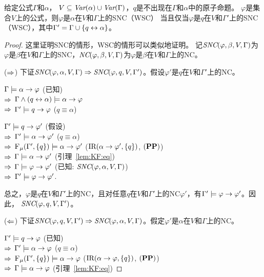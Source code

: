 \begin{proposition}\label{formulaNS_to_p}
	给定公式$\Gamma$和$\alpha$， $V \subseteq \textit{Var}(\alpha) \cup \textit{Var}(\Gamma)$，$q$是不出现在$\Gamma$和$\alpha$中的原子命题。
	$\varphi$是集合$V$上的公式，则$\varphi$是$\alpha$在$V$和$\Gamma$上的SNC（WSC） 当且仅当$\varphi$是$q$在$V$和$\Gamma'$上的SNC（WSC），其中$\Gamma' = \Gamma \cup \{q \leftrightarrow \alpha\}$。
\end{proposition}
\begin{proof}
	这里证明SNC的情形，WSC的情形可以类似地证明。
	记$\emph{SNC}(\varphi,\beta,V,\Gamma)$为$\varphi$是$\beta$在$V$和$\Gamma$上的SNC，$\emph{NC}(\varphi,\beta,V,\Gamma)$为$\varphi$是$\beta$在$V$和$\Gamma$上的NC。
	
	($\Rightarrow$) 下证$\emph{SNC}(\varphi,\alpha,V,\Gamma)\Rightarrow \emph{SNC}(\varphi,q,V,\Gamma')$。假设$\varphi'$是$q$在$V$和$\Gamma'$上的NC。
	
	$\Gamma \models \alpha \rightarrow \varphi$ \hfill  (已知)\\
	$\Rightarrow$ $\Gamma \wedge (q \leftrightarrow \alpha) \models \alpha \rightarrow \varphi$\\
	$\Rightarrow$ $\Gamma' \models q \rightarrow \varphi$  \hfill ($q \equiv \alpha$)
	
	$\Gamma' \models q \rightarrow \varphi'$ \hfill (假设) \\
	$\Rightarrow$ $\Gamma' \models \alpha \rightarrow \varphi'$ \hfill ($q \equiv \alpha$)\\
	$\Rightarrow$ ${\textsc{F}_{\textsc{$\mu$}}}(\Gamma', \{q\}) \models \alpha \rightarrow \varphi'$ \hfill ($\textrm{IR}(\alpha \rightarrow \varphi', \{q\})$, $(\textbf{PP})$)\\
	$\Rightarrow$ $\Gamma \models \alpha \rightarrow \varphi'$ \hfill  (引理~\ref{lem:KF:eq})\\
	$\Rightarrow$ $\Gamma \models \varphi \rightarrow \varphi'$ \hfill  (已知: $\emph{SNC}(\varphi,\alpha,V,\Gamma)$)\\
	$\Rightarrow$ $\Gamma' \models \varphi \rightarrow \varphi'$.
	
	总之，$\varphi$是$q$在$V$和$\Gamma'$上的NC，且对任意$q$在$V$和$\Gamma'$上的NC$\varphi'$，有$\Gamma' \models \varphi \rightarrow \varphi'$。因此， $\emph{SNC}(\varphi,q,V,\Gamma')$。
	
	($\Leftarrow$) 下证$\emph{SNC}(\varphi,q,V,\Gamma')\Rightarrow \emph{SNC}(\varphi,\alpha,V,\Gamma)$。假定$\varphi'$是$\alpha$在$V$和$\Gamma$上的NC。
	
	$\Gamma' \models q \rightarrow \varphi$ \hfill  (已知)\\
	$\Rightarrow$  $\Gamma' \models \alpha \rightarrow \varphi$ \hfill  ($q \equiv \alpha$)\\
	$\Rightarrow$  ${\textsc{F}_{\textsc{$\mu$}}}(\Gamma', \{q\}) \models \alpha \rightarrow \varphi$ \hfill ($\textrm{IR}(\alpha \rightarrow \varphi, \{q\})$, $(\textbf{PP})$)\\
	$\Rightarrow$ $\Gamma \models \alpha \rightarrow \varphi$ \hfill  (引理~\ref{lem:KF:eq})
	

\end{proof}
